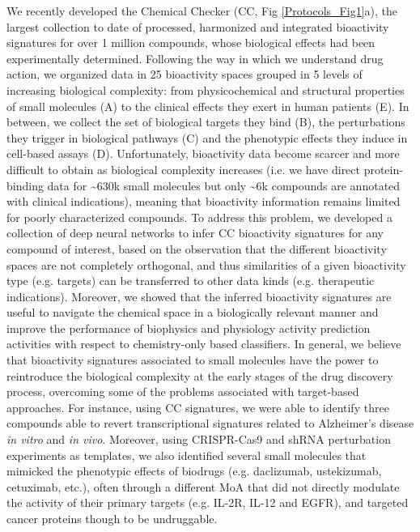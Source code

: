 We recently developed the Chemical Checker (CC, Fig \ref{Protocols_Fig1}a), the largest collection to date of processed, harmonized and integrated bioactivity signatures for over 1 million compounds, whose biological effects had been experimentally determined\cite{duran-frigola_extending_2020}. Following the way in which we understand drug action, we organized data in 25 bioactivity spaces grouped in 5 levels of increasing biological complexity: from physicochemical and structural properties of small molecules (A) to the clinical effects they exert in human patients (E). In between, we collect the set of biological targets they bind (B), the perturbations they trigger in biological pathways (C) and the phenotypic effects they induce in cell-based assays (D). Unfortunately, bioactivity data become scarcer and more difficult to obtain as biological complexity increases (i.e. we have direct protein-binding data for \textasciitilde630k small molecules but only \textasciitilde6k compounds are annotated with clinical indications), meaning that bioactivity information remains limited for poorly characterized compounds. To address this problem, we developed a collection of deep neural networks to infer CC bioactivity signatures for any compound of interest\cite{bertoni_bioactivity_2021, comajuncosa-creus_stereochemically-aware_2024}, based on the observation that the different bioactivity spaces are not completely orthogonal, and thus similarities of a given bioactivity type (e.g. targets) can be transferred to other data kinds (e.g. therapeutic indications). Moreover, we showed that the inferred bioactivity signatures are useful to navigate the chemical space in a biologically relevant manner and improve the performance of biophysics and physiology activity prediction activities with respect to chemistry-only based classifiers. In general, we believe that bioactivity signatures associated to small molecules have the power to reintroduce the biological complexity at the early stages of the drug discovery process, overcoming some of the problems associated with target-based approaches. For instance, using CC signatures, we were able to identify three compounds able to revert transcriptional signatures related to Alzheimer’s disease \textit{in vitro} and \textit{in vivo}\cite{pauls_identification_2021}. Moreover, using CRISPR-Cas9 and shRNA perturbation experiments as templates, we also identified several small molecules that mimicked the phenotypic effects of biodrugs (e.g. daclizumab, ustekizumab, cetuximab, etc.), often through a different MoA that did not directly modulate the activity of their primary targets (e.g. IL-2R, IL-12 and EGFR)\cite{duran-frigola_extending_2020}, and targeted cancer proteins though to be undruggable\cite{bertoni_bioactivity_2021}.


